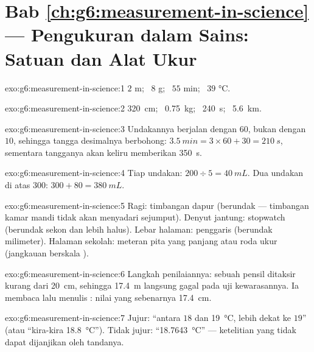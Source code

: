 \section*{Bab \ref{ch:g6:measurement-in-science} --- Pengukuran dalam Sains: Satuan dan Alat Ukur}

\begin{solution}{exo:g6:measurement-in-science:1}
$2$ \unit{m}; \ $8$ \unit{g}; \ $55$ \unit{min}; \ $39$
\unit{\celsius}.
\end{solution}

\begin{solution}{exo:g6:measurement-in-science:2}
\qty{320}{cm}; \ \qty{0.75}{kg}; \ \qty{240}{s}; \ \qty{5.6}{km}.
\end{solution}

\begin{solution}{exo:g6:measurement-in-science:3}
Undakannya berjalan dengan $60$, bukan dengan $10$, sehingga tangga
desimalnya berbohong: $\qty{3.5}{min} = 3 \times 60 + 30 = \qty{210}{s}$,
sementara tangganya akan keliru memberikan \qty{350}{s}.
\end{solution}

\begin{solution}{exo:g6:measurement-in-science:4}
Tiap undakan: $200 \div 5 = \qty{40}{mL}$. Dua undakan di atas $300$:
$300 + 80 = \qty{380}{mL}$.
\end{solution}

\begin{solution}{exo:g6:measurement-in-science:5}
Ragi: timbangan dapur (berundak  --- timbangan kamar mandi tidak
akan menyadari sejumput). Denyut jantung: stopwatch (berundak sekon
dan lebih halus). Lebar halaman: penggaris (berundak milimeter).
Halaman sekolah: meteran pita yang panjang atau roda ukur (jangkauan
berskala ).
\end{solution}

\begin{solution}{exo:g6:measurement-in-science:6}
Langkah penilaiannya: sebuah pensil ditaksir kurang dari \qty{20}{cm},
sehingga \qty{17.4}{m} langsung gagal pada uji kewarasannya. Ia
membaca  lalu menulis : nilai yang sebenarnya
\qty{17.4}{cm}.
\end{solution}

\begin{solution}{exo:g6:measurement-in-science:7}
Jujur: ``antara $18$ dan \qty{19}{\celsius}, lebih dekat ke $19$''
(atau ``kira-kira \qty{18.8}{\celsius}''). Tidak jujur:
``\qty{18.7643}{\celsius}'' --- ketelitian yang tidak dapat dijanjikan
oleh tandanya.
\end{solution}

